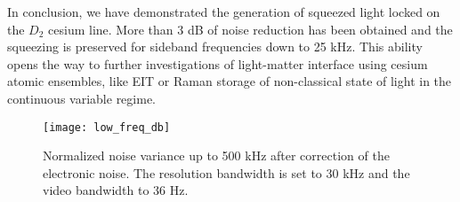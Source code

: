 In conclusion, we have demonstrated the generation of squeezed light locked on the $D_2$ cesium line. More than 3 dB of noise reduction has been obtained and the squeezing is preserved for sideband frequencies down to 25 kHz. This ability opens the way to further investigations of light-matter interface using cesium atomic ensembles, like EIT or Raman storage of non-classical state of light in the continuous variable regime.

\begin{figure}[t!]
\begin{center}
\texttt{[image: low\_freq\_db]}
\end{center}
\caption{Normalized noise variance up to 500
kHz after correction of the
electronic noise. The
resolution bandwidth is set to 30 kHz and the video bandwidth to 36
Hz.
}\label{bf}
\end{figure}
